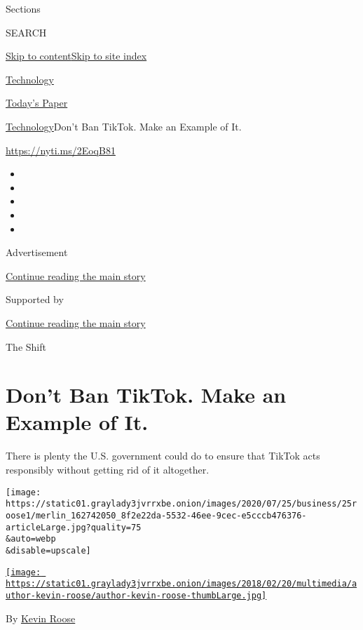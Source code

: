 Sections

SEARCH

\protect\hyperlink{site-content}{Skip to
content}\protect\hyperlink{site-index}{Skip to site index}

\href{https://www.nytimes3xbfgragh.onion/section/technology}{Technology}

\href{https://myaccount.nytimes3xbfgragh.onion/auth/login?response_type=cookie\&client_id=vi}{}

\href{https://www.nytimes3xbfgragh.onion/section/todayspaper}{Today's
Paper}

\href{/section/technology}{Technology}\textbar{}Don't Ban TikTok. Make
an Example of It.

\href{https://nyti.ms/2EoqB81}{https://nyti.ms/2EoqB81}

\begin{itemize}
\item
\item
\item
\item
\item
\end{itemize}

Advertisement

\protect\hyperlink{after-top}{Continue reading the main story}

Supported by

\protect\hyperlink{after-sponsor}{Continue reading the main story}

The Shift

\hypertarget{dont-ban-tiktok-make-an-example-of-it}{%
\section{Don't Ban TikTok. Make an Example of
It.}\label{dont-ban-tiktok-make-an-example-of-it}}

There is plenty the U.S. government could do to ensure that TikTok acts
responsibly without getting rid of it altogether.

\texttt{[image: https://static01.graylady3jvrrxbe.onion/images/2020/07/25/business/25roose1/merlin\_162742050\_8f2e22da-5532-46ee-9cec-e5cccb476376-articleLarge.jpg?quality=75\\\&auto=webp\\\&disable=upscale]}

\href{https://www.nytimes3xbfgragh.onion/by/kevin-roose}{\texttt{[image: https://static01.graylady3jvrrxbe.onion/images/2018/02/20/multimedia/author-kevin-roose/author-kevin-roose-thumbLarge.jpg]}}

By \href{https://www.nytimes3xbfgragh.onion/by/kevin-roose}{Kevin Roose}

